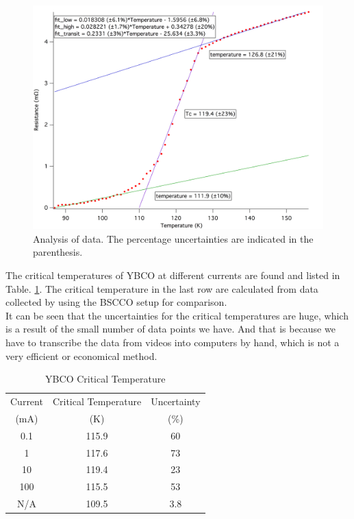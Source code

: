 \documentclass[prb,preprint]{revtex4-1}
\begin{document}
\begin{figure}[h]
\centering
\includegraphics[width=14cm]{ybco10ma.png}
\caption{Analysis of data. The percentage uncertainties are indicated in the parenthesis. }
\label{ybcoanalysis}
\end{figure}

The critical temperatures of YBCO at different currents are found and listed in Table. \ref{ybcodata}. The critical temperature in the last row are calculated from data collected by using the BSCCO setup for comparison. \\

It can be seen that the uncertainties for the critical temperatures are huge, which is a result of the small number of data points we have. And that is because we have to transcribe the data from videos into computers by hand, which is not a very efficient or economical method.\\

\begin{table}[h]
\centering
\caption{YBCO Critical Temperature}
\begin{ruledtabular}
\begin{tabular}{ c c c}
Current & Critical Temperature & Uncertainty\\
(mA) & (K) & (\%)\\
\hline
0.1 & 115.9 & 60 \\
1 & 117.6 & 73 \\
10 & 119.4 & 23 \\
100 & 115.5 & 53 \\
N/A & 109.5 & 3.8 \\
\end{tabular}
\end{ruledtabular}
\label{ybcodata}
\end{table}
\end{document}
